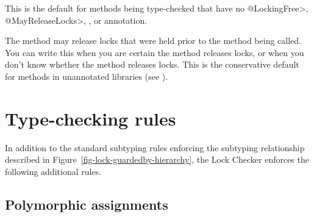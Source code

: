 \begin{sloppypar}
\begin{description}
  This is the default for methods being type-checked that have no \<@LockingFree>,
  \<@MayReleaseLocks>, , or 
  annotation.

\item[\refqualclass{dataflow/qual}{MayReleaseLocks}]
  The method may release locks that were held prior to the method being called.
  You can write this when you are certain the method releases locks, or
  when you don't know whether the method releases locks.
  This is the conservative default for methods in unannotated libraries (see ).

\end{description}
\end{sloppypar}


\section{Type-checking rules\label{lock-type-checking-rules}}

In addition to the standard subtyping rules enforcing the subtyping relationship
described in Figure~\ref{fig-lock-guardedby-hierarchy}, the Lock Checker enforces
the following additional rules.


\subsection{Polymorphic assignments\label{lock-type-checking-rules-polymorphic-assignments}}

